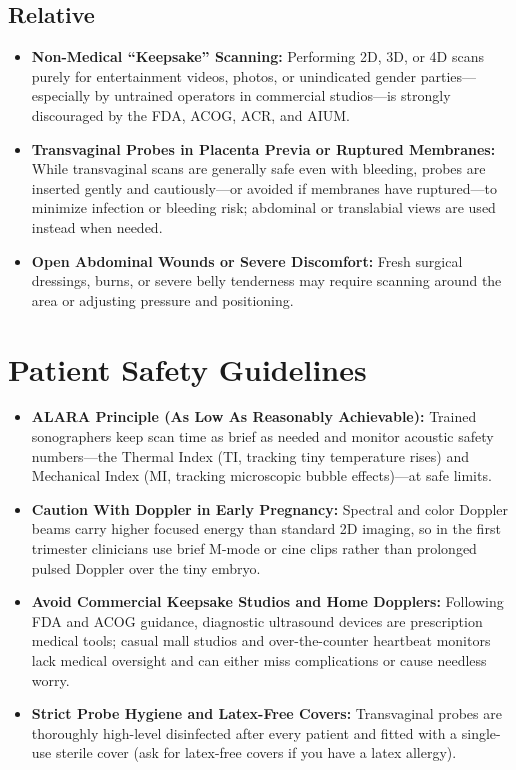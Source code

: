 \subsection{Relative}
\begin{itemize}
\item \textbf{Non-Medical ``Keepsake'' Scanning:} Performing 2D, 3D, or 4D scans purely for entertainment videos, photos, or unindicated gender parties---especially by untrained operators in commercial studios---is strongly discouraged by the FDA, ACOG, ACR, and AIUM.
\item \textbf{Transvaginal Probes in Placenta Previa or Ruptured Membranes:} While transvaginal scans are generally safe even with bleeding, probes are inserted gently and cautiously---or avoided if membranes have ruptured---to minimize infection or bleeding risk; abdominal or translabial views are used instead when needed.
\item \textbf{Open Abdominal Wounds or Severe Discomfort:} Fresh surgical dressings, burns, or severe belly tenderness may require scanning around the area or adjusting pressure and positioning.
\end{itemize}

\section{Patient Safety Guidelines}
\begin{itemize}
\item \textbf{ALARA Principle (As Low As Reasonably Achievable):} Trained sonographers keep scan time as brief as needed and monitor acoustic safety numbers---the Thermal Index (TI, tracking tiny temperature rises) and Mechanical Index (MI, tracking microscopic bubble effects)---at safe limits.
\item \textbf{Caution With Doppler in Early Pregnancy:} Spectral and color Doppler beams carry higher focused energy than standard 2D imaging, so in the first trimester clinicians use brief M-mode or cine clips rather than prolonged pulsed Doppler over the tiny embryo.
\item \textbf{Avoid Commercial Keepsake Studios and Home Dopplers:} Following FDA and ACOG guidance, diagnostic ultrasound devices are prescription medical tools; casual mall studios and over-the-counter heartbeat monitors lack medical oversight and can either miss complications or cause needless worry.
\item \textbf{Strict Probe Hygiene and Latex-Free Covers:} Transvaginal probes are thoroughly high-level disinfected after every patient and fitted with a single-use sterile cover (ask for latex-free covers if you have a latex allergy).
\end{itemize}

